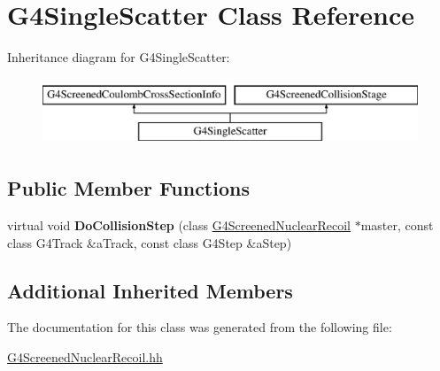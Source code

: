\hypertarget{classG4SingleScatter}{\section{G4\-Single\-Scatter Class Reference}
\label{classG4SingleScatter}
}
Inheritance diagram for G4\-Single\-Scatter\-:\begin{figure}[H]
\begin{center}
\leavevmode
\includegraphics[height=2.000000cm]{classG4SingleScatter}
\end{center}
\end{figure}
\subsection*{Public Member Functions}
\begin{DoxyCompactItemize}
\item 
\hypertarget{classG4SingleScatter_a4bcd2efb40f43b024ea34752c730b271}{virtual void {\bfseries Do\-Collision\-Step} (class \hyperlink{classG4ScreenedNuclearRecoil}{G4\-Screened\-Nuclear\-Recoil} $\ast$master, const class G4\-Track \&a\-Track, const class G4\-Step \&a\-Step)}\label{classG4SingleScatter_a4bcd2efb40f43b024ea34752c730b271}

\end{DoxyCompactItemize}
\subsection*{Additional Inherited Members}


The documentation for this class was generated from the following file\-:\begin{DoxyCompactItemize}
\item 
\hyperlink{G4ScreenedNuclearRecoil_8hh}{G4\-Screened\-Nuclear\-Recoil.\-hh}\end{DoxyCompactItemize}
